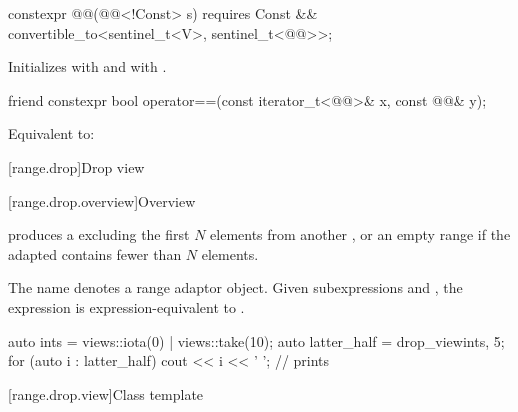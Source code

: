 %
\begin{itemdecl}
constexpr @@(@@<!Const> s)
  requires Const && convertible_to<sentinel_t<V>, sentinel_t<@@>>;
\end{itemdecl}

\begin{itemdescr}
\pnum
\effects
Initializes  with  and
 with .
\end{itemdescr}

%
\begin{itemdecl}
friend constexpr bool operator==(const iterator_t<@@>& x, const @@& y);
\end{itemdecl}

\begin{itemdescr}
\pnum
\effects
Equivalent to:
\end{itemdescr}

[range.drop]{Drop view}

[range.drop.overview]{Overview}

\pnum
{} produces a 
excluding the first $N$ elements from another , or
an empty range if the adapted  contains fewer than $N$ elements.

\pnum
The name  denotes
a range adaptor object.
Given subexpressions  and ,
the expression 
is expression-equivalent to .

\pnum
\begin{example}
\begin{codeblock}
auto ints = views::iota(0) | views::take(10);
auto latter_half = drop_view{ints, 5};
for (auto i : latter_half) {
  cout << i << ' ';                             // prints 
}
\end{codeblock}
\end{example}

[range.drop.view]{Class template }

